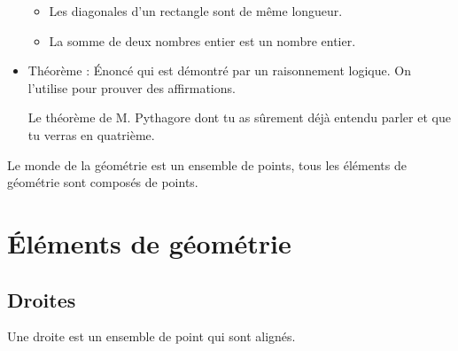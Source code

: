 \begin{pageCours}
\begin{Def}
\begin{itemize}
\begin{Ex}
\begin{itemize}
\item Les diagonales d'un rectangle sont de même longueur.
\item La somme de deux nombres entier est un nombre entier.
\end{itemize}
\end{Ex}
\item \textcolor{sacado_orange}{Théorème} : Énoncé qui est démontré par un raisonnement logique. On l'utilise pour prouver des affirmations.
\begin{Ex}
Le théorème de M. Pythagore dont tu as sûrement déjà entendu parler et que tu verras en quatrième.
\end{Ex}
\end{itemize}
\end{Def}


\begin{Def}
Le monde de la géométrie est un ensemble de points, tous les éléments de géométrie sont composés de points.
\end{Def}

\section{Éléments de géométrie}

\subsection{Droites}

\begin{Def}
Une droite est un ensemble de point qui sont alignés.
\end{Def}

\begin{Ex}
\begin{center}
\end{center}
\end{Ex}


\end{pageCours}

